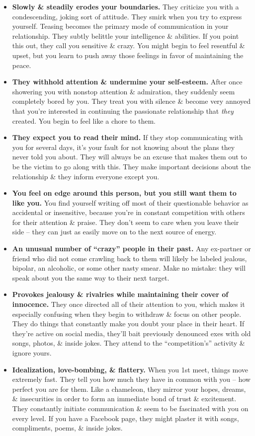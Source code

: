\documentclass{article}
\numberwithin{equation}{section}
\begin{document}
\begin{itemize}
	\item \textbf{Slowly \& steadily erodes your boundaries.} They criticize you with a condescending, joking sort of attitude. They smirk when you try to express yourself. Teasing becomes the primary mode of communication in your relationship. They subtly belittle your intelligence \& abilities. If you point this out, they call you sensitive \& crazy. You might begin to feel resentful \& upset, but you learn to push away those feelings in favor of maintaining the peace.
	\item \textbf{They withhold attention \& undermine your self-esteem.} After once showering you with nonstop attention \& admiration, they suddenly seem completely bored by you. They treat you with silence \& become very annoyed that you're interested in continuing the passionate relationship that \textit{they} created. You begin to feel like a chore to them.
	\item \textbf{They expect you to read their mind.} If they stop communicating with you for several days, it's your fault for not knowing about the plans they never told you about. They will always be an excuse that makes them out to be the victim to go along with this. They make important decisions about the relationship \& they inform everyone except you.
	\item \textbf{You feel on edge around this person, but you still want them to like you.} You find yourself writing off most of their questionable behavior as accidental or insensitive, because you're in constant competition with others for their attention \& praise. They don't seem to care when you leave their side -- they can just as easily move on to the next source of energy.
	\item \textbf{An unusual number of ``crazy'' people in their past.} Any ex-partner or friend who did not come crawling back to them will likely be labeled jealous, bipolar, an alcoholic, or some other nasty smear. Make no mistake: they will speak about you the same way to their next target.
	\item \textbf{Provokes jealousy \& rivalries while maintaining their cover of innocence.} They once directed all of their attention to you, which makes it especially confusing when they begin to withdraw \& focus on other people. They do things that constantly make you doubt your place in their heart. If they're active on social media, they'll bait previously denounced exes with old songs, photos, \& inside jokes. They attend to the ``competition's'' activity \& ignore yours.
	\item \textbf{Idealization, love-bombing, \& flattery.} When you 1st meet, things move extremely fast. They tell you how much they have in common with you -- how perfect you are for them. Like a chameleon, they mirror your hopes, dreams, \& insecurities in order to form an immediate bond of trust \& excitement. They constantly initiate communication \& seem to be fascinated with you on every level. If you have a Facebook page, they might plaster it with songs, compliments, poems, \& inside jokes.

\end{itemize}
\end{document}
